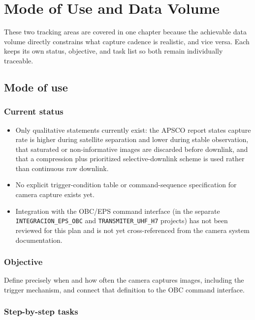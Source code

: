 \chapter{Mode of Use and Data Volume}
\label{chap:data-mode-of-use}

These two tracking areas are covered in one chapter because the achievable data volume directly constrains what capture cadence is realistic, and vice versa. Each keeps its own status, objective, and task list so both remain individually traceable.

\section{Mode of use}

\subsection{Current status}

\begin{itemize}
    \item Only qualitative statements currently exist: the APSCO report states capture rate is higher during satellite separation and lower during stable observation, that saturated or non-informative images are discarded before downlink, and that a compression plus prioritized selective-downlink scheme is used rather than continuous raw downlink.
    \item No explicit trigger-condition table or command-sequence specification for camera capture exists yet.
    \item Integration with the OBC/EPS command interface (in the separate \texttt{INTEGRACION\_EPS\_OBC} and \texttt{TRANSMITER\_UHF\_H7} projects) has not been reviewed for this plan and is not yet cross-referenced from the camera system documentation.
\end{itemize}

\subsection{Objective}

Define precisely when and how often the camera captures images, including the trigger mechanism, and connect that definition to the OBC command interface.

\subsection{Step-by-step tasks}

